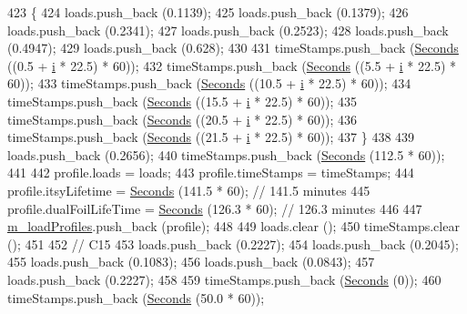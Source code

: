 \begin{DoxyCode}
423     \{
424       loads.push\_back (0.1139);
425       loads.push\_back (0.1379);
426       loads.push\_back (0.2341);
427       loads.push\_back (0.2523);
428       loads.push\_back (0.4947);
429       loads.push\_back (0.628);
430 
431       timeStamps.push\_back (\hyperlink{group__timecivil_ga33c34b816f8ff6628e33d5c8e9713b9e}{Seconds} ((0.5 + \hyperlink{bernuolliDistribution_8m_a6f6ccfcf58b31cb6412107d9d5281426}{i} * 22.5) * 60));
432       timeStamps.push\_back (\hyperlink{group__timecivil_ga33c34b816f8ff6628e33d5c8e9713b9e}{Seconds} ((5.5 + \hyperlink{bernuolliDistribution_8m_a6f6ccfcf58b31cb6412107d9d5281426}{i} * 22.5) * 60));
433       timeStamps.push\_back (\hyperlink{group__timecivil_ga33c34b816f8ff6628e33d5c8e9713b9e}{Seconds} ((10.5 + \hyperlink{bernuolliDistribution_8m_a6f6ccfcf58b31cb6412107d9d5281426}{i} * 22.5) * 60));
434       timeStamps.push\_back (\hyperlink{group__timecivil_ga33c34b816f8ff6628e33d5c8e9713b9e}{Seconds} ((15.5 + \hyperlink{bernuolliDistribution_8m_a6f6ccfcf58b31cb6412107d9d5281426}{i} * 22.5) * 60));
435       timeStamps.push\_back (\hyperlink{group__timecivil_ga33c34b816f8ff6628e33d5c8e9713b9e}{Seconds} ((20.5 + \hyperlink{bernuolliDistribution_8m_a6f6ccfcf58b31cb6412107d9d5281426}{i} * 22.5) * 60));
436       timeStamps.push\_back (\hyperlink{group__timecivil_ga33c34b816f8ff6628e33d5c8e9713b9e}{Seconds} ((21.5 + \hyperlink{bernuolliDistribution_8m_a6f6ccfcf58b31cb6412107d9d5281426}{i} * 22.5) * 60));
437     \}
438 
439   loads.push\_back (0.2656);
440   timeStamps.push\_back (\hyperlink{group__timecivil_ga33c34b816f8ff6628e33d5c8e9713b9e}{Seconds} (112.5 * 60));
441 
442   profile.loads = loads;
443   profile.timeStamps = timeStamps;
444   profile.itsyLifetime = \hyperlink{group__timecivil_ga33c34b816f8ff6628e33d5c8e9713b9e}{Seconds} (141.5 * 60);      \textcolor{comment}{// 141.5 minutes}
445   profile.dualFoilLifeTime = \hyperlink{group__timecivil_ga33c34b816f8ff6628e33d5c8e9713b9e}{Seconds} (126.3 * 60);  \textcolor{comment}{// 126.3 minutes}
446 
447   \hyperlink{classBatteryLifetimeTest_aee9ad324da18f58ee75689778580c3fb}{m\_loadProfiles}.push\_back (profile);
448 
449   loads.clear ();
450   timeStamps.clear ();
451 
452   \textcolor{comment}{// C15}
453   loads.push\_back (0.2227);
454   loads.push\_back (0.2045);
455   loads.push\_back (0.1083);
456   loads.push\_back (0.0843);
457   loads.push\_back (0.2227);
458 
459   timeStamps.push\_back (\hyperlink{group__timecivil_ga33c34b816f8ff6628e33d5c8e9713b9e}{Seconds} (0));
460   timeStamps.push\_back (\hyperlink{group__timecivil_ga33c34b816f8ff6628e33d5c8e9713b9e}{Seconds} (50.0 * 60));

\end{DoxyCode}
